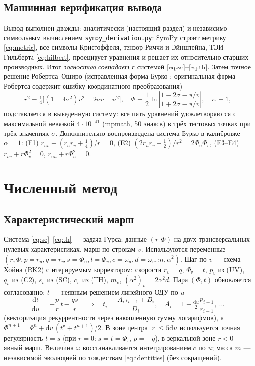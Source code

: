 \documentclass[11pt,a4paper]{article}
\newcommand{\dd}{\mathrm{d}}
\begin{document}
\subsection{Машинная верификация вывода}
\label{sec:verif}
Вывод выполнен дважды: аналитически (настоящий раздел) и независимо ---
символьным вычислением \texttt{sympy\_derivation.py}: SymPy строит метрику
\eqref{eq:metric}, все символы Кристоффеля, тензор Риччи и Эйнштейна, ТЭИ
Гильберта \eqref{eq:hilbert}, проецирует уравнения и решает их относительно
старших производных. Итог \emph{полностью совпадает} с системой
\eqref{eq:sc}--\eqref{eq:th}. Затем точное решение Робертса--Оширо
(исправленная форма Бурко \cite{burko1996}; оригинальная форма Робертса
содержит ошибку координатного преобразования)
\begin{equation}
r^2=\tfrac14\bigl[(1-4\sigma^2)v^2-2uv+u^2\bigr],\quad
\Phi=\frac12\ln\left|\frac{1-2\sigma-u/v}{1+2\sigma-u/v}\right|,\quad
\alpha=1,
\label{eq:roberts}
\end{equation}
подставляется в выведенную систему: все пять уравнений удовлетворяются с
максимальной невязкой $4\cdot10^{-41}$ (mpmath, 50 знаков) в трёх тестовых
точках при трёх значениях $\sigma$. Дополнительно воспроизведена система
Бурко в калибровке $\alpha=1$: (E1) $r_{uv}+(r_ur_v+\tfrac14)/r=0$,
(E2) $(2r_ur_v+\tfrac12)/r^2=2\Phi_u\Phi_v$, (E3--E4) $r_{vv}+r\Phi_v^2=0$,
$r_{uu}+r\Phi_u^2=0$.

\section{Численный метод}

\subsection{Характеристический марш}
Система \eqref{eq:sc}--\eqref{eq:th} --- задача Гурса: данные $(r,\Phi)$ на
двух трансверсальных нулевых характеристиках, марш по строкам $v$. Используются
переменные $(r,\Phi,p=r_u,q=r_v,s=\Phi_u,t=\Phi_v,c=\omega_u,d=\omega_v,m,
\alpha^2)$. Шаг по $v$ --- схема Хойна (RK2) с итерируемым корректором:
скорости $r_v=q$, $\Phi_v=t$, $p_v$ из (UV), $q_v$ из (C2), $s_v$ из (SC),
$c_v$ из (TH), $m_v$, $(\alpha^2)_v=2\alpha^2 d$. Пара $(\Phi,t)$ обновляется
согласованно: $t$ --- неявным решением линейного ОДУ по $u$
\begin{equation}
\frac{\dd t}{\dd u}=-\frac{p}{r}\,t-\frac{qs}{r}
\quad\Longrightarrow\quad
t_i=\frac{A_i\,t_{i-1}+B_i}{D_i},\quad
A_i=1-\tfrac{\dd u}{2}\frac{p_{i-1}}{r_{i-1}},\ \dots
\label{eq:tode}
\end{equation}
(векторизация рекуррентности через накопленную сумму логарифмов), а
$\Phi^{n+1}=\Phi^n+\dd v\,(t^n+t^{n+1})/2$. В зоне центра $|r|\le5\dd u$
используется точная регулярность $t=s$ (при $r=0$: $s=t=\Phi_\tau$,
$p=-q$), в зеркальной зоне $r<0$ --- явный марш. Величина $\omega$
восстанавливается интегрированием $c$ по $u$; масса $m$ --- независимой
эволюцией по тождествам \eqref{eq:identities} (без сокращений).
\end{document}
